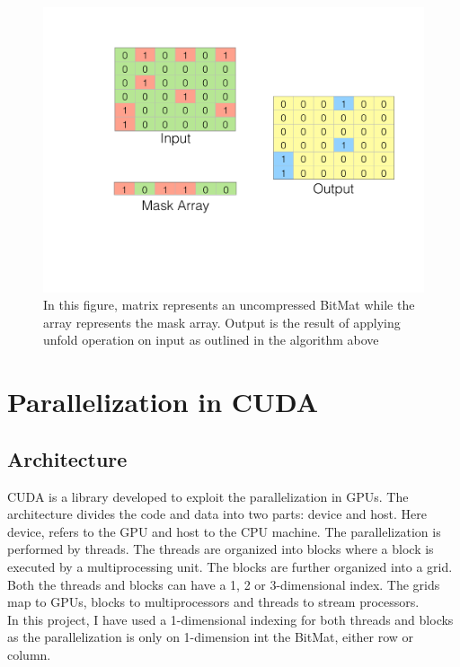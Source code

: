 \documentclass{article}
\begin{document}
\begin{figure}[h]
        \includegraphics[width=\textwidth]{AND.pdf}
        \caption{In this figure, matrix represents an uncompressed BitMat while the array represents the mask array. Output is the result of applying unfold operation on input as outlined in the algorithm above}
        \centering
\end{figure}

\section*{Parallelization in CUDA}
\subsection*{Architecture}
CUDA is a library developed to exploit the parallelization in GPUs. The architecture divides the code and data into two parts: device and host. Here device, refers to the GPU and host to the CPU machine. The parallelization is performed by threads. The threads are organized into blocks where a block is executed by a multiprocessing unit. The blocks are further organized into a grid. Both the threads and blocks can have a 1, 2 or 3-dimensional index. The grids map to GPUs, blocks to multiprocessors and threads to stream processors.\\

In this project, I have used a 1-dimensional indexing for both threads and blocks as the parallelization is only on 1-dimension int the BitMat, either row or column.
\end{document}
